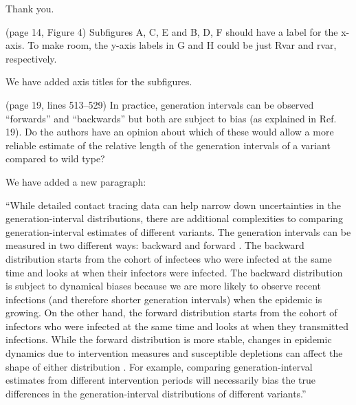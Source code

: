 \documentclass[12pt]{article}
\newcommand{\revtext}{\textsf}
\begin{document}
Thank you.

\revtext{(page 14, Figure 4) Subfigures A, C, E and B, D, F should have a label
for the x-axis. To make room, the y-axis labels in G and H could be just
Rvar and rvar, respectively.}

We have added axis titles for the subfigures.

\revtext{(page 19, lines 513–529) In practice, generation intervals can be observed
``forwards'' and ``backwards'' but both are subject to bias (as explained in
Ref. 19). Do the authors have an opinion about which of these would allow
a more reliable estimate of the relative length of the generation intervals
of a variant compared to wild type?}

We have added a new paragraph:

``While detailed contact tracing data can help narrow down uncertainties in the generation-interval distributions, there are additional complexities to comparing generation-interval estimates of different variants.
The generation intervals can be measured in two different ways: backward and forward \citep{champredon2015intrinsic}.
The backward distribution starts from the cohort of infectees who were infected at the same time and looks at when their infectors were infected. 
The backward distribution is subject to dynamical biases because we are more likely to observe recent infections (and therefore shorter generation intervals) when the epidemic is growing.
On the other hand, the forward distribution starts from the cohort of infectors who were infected at the same time and looks at when they transmitted infections.
While the forward distribution is more stable, changes in epidemic dynamics due to intervention measures and susceptible depletions can affect the shape of either distribution \citep{ali2020serial, nishiura2010time}.
For example, comparing generation-interval estimates from different intervention periods will necessarily bias the true differences in the generation-interval distributions of different variants.''


\end{document}
